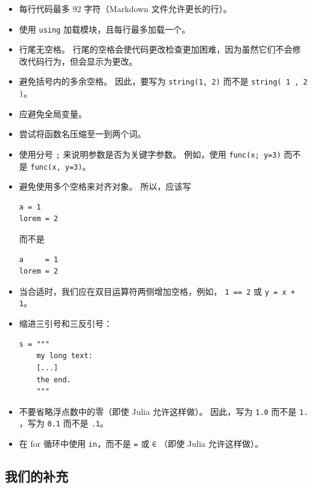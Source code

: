\documentclass[
  notoc %
]{tufte-book}
\newcommand{\passthrough}[1]{#1}
\begin{document}
\begin{itemize}
\item
  每行代码最多 92 字符（Markdown 文件允许更长的行）。
\item
  使用 \passthrough{\lstinline!using!} 加载模块，且每行最多加载一个。
\item
  行尾无空格。
  行尾的空格会使代码更改检查更加困难，因为虽然它们不会修改代码行为，但会显示为更改。
\item
  避免括号内的多余空格。 因此，要写为
  \passthrough{\lstinline!string(1, 2)!} 而不是
  \passthrough{\lstinline!string( 1 , 2 )!}。
\item
  应避免全局变量。
\item
  尝试将函数名压缩至一到两个词。
\item
  使用分号 \passthrough{\lstinline!;!} 来说明参数是否为关键字参数。
  例如，使用 \passthrough{\lstinline!func(x; y=3)!} 而不是
  \passthrough{\lstinline!func(x, y=3)!}。
\item
  避免使用多个空格来对齐对象。 所以，应该写

\begin{lstlisting}
a = 1
lorem = 2
\end{lstlisting}

  而不是

\begin{lstlisting}
a     = 1
lorem = 2
\end{lstlisting}
\item
  当合适时，我们应在双目运算符两侧增加空格，例如，
  \passthrough{\lstinline!1 == 2!} 或
  \passthrough{\lstinline!y = x + 1!}。
\item
  缩进三引号和三反引号：

\begin{lstlisting}
s = """
    my long text:
    [...]
    the end.
    """
\end{lstlisting}
\item
  不要省略浮点数中的零（即使 Julia 允许这样做）。 因此，写为
  \passthrough{\lstinline!1.0!} 而不是 \passthrough{\lstinline!1.!}
  ，写为 \passthrough{\lstinline!0.1!} 而不是
  \passthrough{\lstinline!.1!}。
\item
  在 for 循环中使用 \passthrough{\lstinline!in!}，而不是
  \passthrough{\lstinline!=!} 或 \passthrough{\lstinline!∈!} （即使
  Julia 允许这样做）。
\end{itemize}

\hypertarget{ux6211ux4eecux7684ux8865ux5145}{%
\subsection{我们的补充}\label{ux6211ux4eecux7684ux8865ux5145}}
\end{document}
